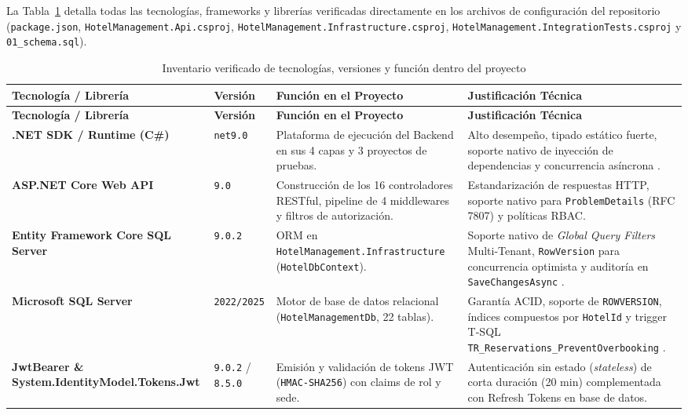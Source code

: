 \documentclass[12pt,a4paper]{article}
\begin{document}
La Tabla~\ref{tab:tecnologias_reales} detalla todas las tecnolog\'ias, frameworks y librer\'ias verificadas directamente en los archivos de configuraci\'on del repositorio (\texttt{package.json}, \texttt{HotelManagement.Api.csproj}, \texttt{HotelManagement.Infrastructure.csproj}, \texttt{HotelManagement.IntegrationTests.csproj} y \texttt{01\_schema.sql}).

\begin{longtable}{p{3.6cm} p{1.8cm} p{4.2cm} p{5.0cm}}
\caption{Inventario verificado de tecnolog\'ias, versiones y funci\'on dentro del proyecto}
\label{tab:tecnologias_reales}\\
\toprule
\textbf{Tecnolog\'ia / Librer\'ia} & \textbf{Versi\'on} & \textbf{Funci\'on en el Proyecto} & \textbf{Justificaci\'on T\'ecnica}\\
\midrule
\endfirsthead
\toprule
\textbf{Tecnolog\'ia / Librer\'ia} & \textbf{Versi\'on} & \textbf{Funci\'on en el Proyecto} & \textbf{Justificaci\'on T\'ecnica}\\
\midrule
\endhead
\bottomrule
\endfoot
\textbf{.NET SDK / Runtime (C\#)} & \texttt{net9.0} & Plataforma de ejecuci\'on del Backend en sus 4 capas y 3 proyectos de pruebas. & Alto desempe\~no, tipado est\'atico fuerte, soporte nativo de inyecci\'on de dependencias y concurrencia as\'incrona \cite{dotnet9_docs}.\\[0.12cm]
\textbf{ASP.NET Core Web API} & \texttt{9.0} & Construcci\'on de los 16 controladores RESTful, pipeline de 4 middlewares y filtros de autorizaci\'on. & Estandarizaci\'on de respuestas HTTP, soporte nativo para \texttt{ProblemDetails} (RFC 7807) y pol\'iticas RBAC.\\[0.12cm]
\textbf{Entity Framework Core SQL Server} & \texttt{9.0.2} & ORM en \texttt{HotelManagement.Infrastructure} (\texttt{HotelDbContext}). & Soporte nativo de \textit{Global Query Filters} Multi-Tenant, \texttt{RowVersion} para concurrencia optimista y auditor\'ia en \texttt{SaveChangesAsync} \cite{efcore_queryfilters}.\\[0.12cm]
\textbf{Microsoft SQL Server} & \texttt{2022/2025} & Motor de base de datos relacional (\texttt{HotelManagementDb}, 22 tablas). & Garant\'ia ACID, soporte de \texttt{ROWVERSION}, \'indices compuestos por \texttt{HotelId} y trigger T-SQL \texttt{TR\_Reservations\_PreventOverbooking} \cite{sqlserver_docs}.\\[0.12cm]
\textbf{JwtBearer \& System.IdentityModel.Tokens.Jwt} & \texttt{9.0.2} / \texttt{8.5.0} & Emisi\'on y validaci\'on de tokens JWT (\texttt{HMAC-SHA256}) con claims de rol y sede. & Autenticaci\'on sin estado (\textit{stateless}) de corta duraci\'on (20 min) complementada con Refresh Tokens en base de datos.\\[0.12cm]

\end{longtable}
\end{document}
